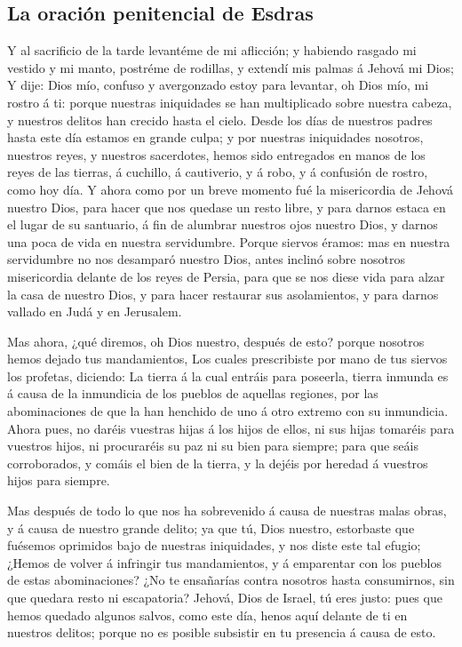 \hypertarget{la-oraciuxf3n-penitencial-de-esdras}{%
\subsection{La oración penitencial de
Esdras}\label{la-oraciuxf3n-penitencial-de-esdras}}

 Y al sacrificio de la tarde levantéme de mi aflicción; y
habiendo rasgado mi vestido y mi manto, postréme de rodillas, y extendí
mis palmas á Jehová mi Dios;  Y dije: Dios mío, confuso y
avergonzado estoy para levantar, oh Dios mío, mi rostro á ti: porque
nuestras iniquidades se han multiplicado sobre nuestra cabeza, y
nuestros delitos han crecido hasta el cielo.  Desde los
días de nuestros padres hasta este día estamos en grande culpa; y por
nuestras iniquidades nosotros, nuestros reyes, y nuestros sacerdotes,
hemos sido entregados en manos de los reyes de las tierras, á cuchillo,
á cautiverio, y á robo, y á confusión de rostro, como hoy día.
 Y ahora como por un breve momento fué la misericordia de
Jehová nuestro Dios, para hacer que nos quedase un resto libre, y para
darnos estaca en el lugar de su santuario, á fin de alumbrar nuestros
ojos nuestro Dios, y darnos una poca de vida en nuestra servidumbre.
 Porque siervos éramos: mas en nuestra servidumbre no nos
desamparó nuestro Dios, antes inclinó sobre nosotros misericordia
delante de los reyes de Persia, para que se nos diese vida para alzar la
casa de nuestro Dios, y para hacer restaurar sus asolamientos, y para
darnos vallado en Judá y en Jerusalem.

 Mas ahora, ¿qué diremos, oh Dios nuestro, después de
esto? porque nosotros hemos dejado tus mandamientos,  Los
cuales prescribiste por mano de tus siervos los profetas, diciendo: La
tierra á la cual entráis para poseerla, tierra inmunda es á causa de la
inmundicia de los pueblos de aquellas regiones, por las abominaciones de
que la han henchido de uno á otro extremo con su inmundicia.
 Ahora pues, no daréis vuestras hijas á los hijos de
ellos, ni sus hijas tomaréis para vuestros hijos, ni procuraréis su paz
ni su bien para siempre; para que seáis corroborados, y comáis el bien
de la tierra, y la dejéis por heredad á vuestros hijos para siempre.

 Mas después de todo lo que nos ha sobrevenido á causa de
nuestras malas obras, y á causa de nuestro grande delito; ya que tú,
Dios nuestro, estorbaste que fuésemos oprimidos bajo de nuestras
iniquidades, y nos diste este tal efugio;  ¿Hemos de
volver á infringir tus mandamientos, y á emparentar con los pueblos de
estas abominaciones? ¿No te ensañarías contra nosotros hasta
consumirnos, sin que quedara resto ni escapatoria? 
Jehová, Dios de Israel, tú eres justo: pues que hemos quedado algunos
salvos, como este día, henos aquí delante de ti en nuestros delitos;
porque no es posible subsistir en tu presencia á causa de esto.


